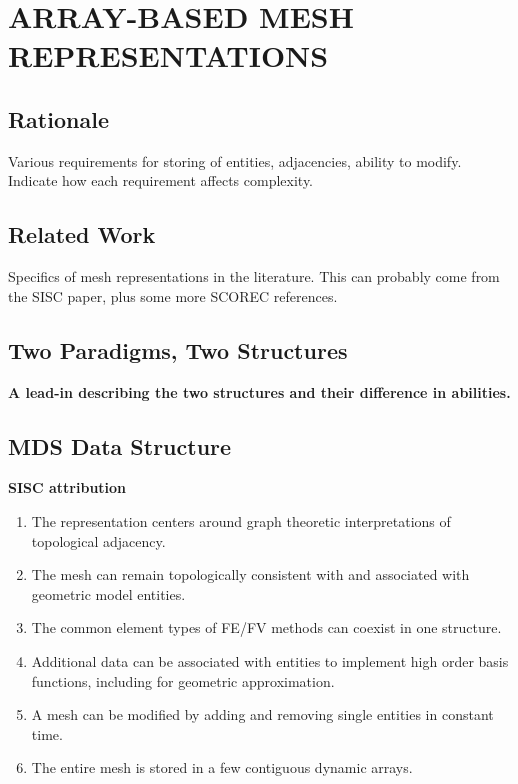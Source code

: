 
\chapter{ARRAY-BASED MESH REPRESENTATIONS}
\label{chap:struct}

\section{Rationale}

Various requirements for storing of entities, adjacencies,
ability to modify.
Indicate how each requirement affects complexity.

\section{Related Work}

Specifics of mesh representations in the literature.
This can probably come from the SISC paper, plus
some more SCOREC references.

\section{Two Paradigms, Two Structures}
\label{sec:two_codes}

{\bf A lead-in describing the two structures and their difference
in abilities.}

\section{MDS Data Structure}
\label{sec:sisc}

{\bf SISC attribution}

\begin{enumerate}
\item The representation centers around graph theoretic interpretations
of topological adjacency.
\item The mesh can remain topologically consistent with and associated with
geometric model entities.
\item The common element types of FE/FV methods can coexist in one structure.
\item Additional data can be associated with entities to implement
high order basis functions, including for geometric approximation.
\item A mesh can be modified by adding and removing single entities in constant time.
\item The entire mesh is stored in a few contiguous dynamic arrays.
\end{enumerate}

